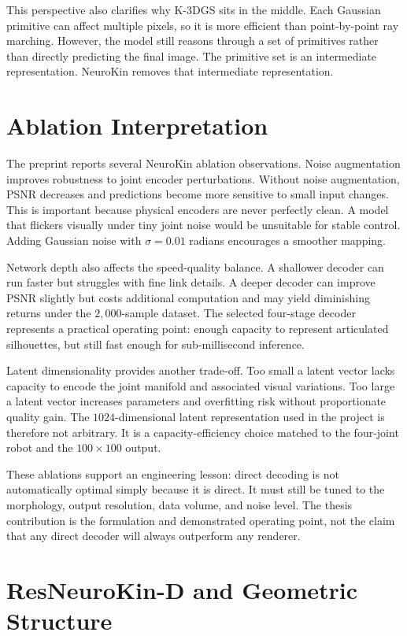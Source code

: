 \documentclass[12pt,a4paper,oneside]{report}
\begin{document}
This perspective also clarifies why K-3DGS sits in the middle. Each Gaussian primitive can affect multiple pixels, so it is more efficient than point-by-point ray marching. However, the model still reasons through a set of primitives rather than directly predicting the final image. The primitive set is an intermediate representation. NeuroKin removes that intermediate representation.

\section{Ablation Interpretation}

The preprint reports several NeuroKin ablation observations. Noise augmentation improves robustness to joint encoder perturbations. Without noise augmentation, PSNR decreases and predictions become more sensitive to small input changes. This is important because physical encoders are never perfectly clean. A model that flickers visually under tiny joint noise would be unsuitable for stable control. Adding Gaussian noise with $\sigma=0.01$ radians encourages a smoother mapping.

Network depth also affects the speed-quality balance. A shallower decoder can run faster but struggles with fine link details. A deeper decoder can improve PSNR slightly but costs additional computation and may yield diminishing returns under the $2{,}000$-sample dataset. The selected four-stage decoder represents a practical operating point: enough capacity to represent articulated silhouettes, but still fast enough for sub-millisecond inference.

Latent dimensionality provides another trade-off. Too small a latent vector lacks capacity to encode the joint manifold and associated visual variations. Too large a latent vector increases parameters and overfitting risk without proportionate quality gain. The $1024$-dimensional latent representation used in the project is therefore not arbitrary. It is a capacity-efficiency choice matched to the four-joint robot and the $100 \times 100$ output.

These ablations support an engineering lesson: direct decoding is not automatically optimal simply because it is direct. It must still be tuned to the morphology, output resolution, data volume, and noise level. The thesis contribution is the formulation and demonstrated operating point, not the claim that any direct decoder will always outperform any renderer.

\section{ResNeuroKin-D and Geometric Structure}
\end{document}
